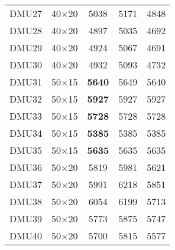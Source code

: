 \begin{table}[H]
\begin{tabular}{@{}ccccc@{}}
DMU27 & 40$\times$20 & 5038 & 5171 & 4848\\ 
DMU28 & 40$\times$20 & 4897 & 5035 & 4692\\ 
DMU29 & 40$\times$20 & 4924 & 5067 & 4691\\ 
DMU30 & 40$\times$20 & 4932 & 5093 & 4732\\ 
DMU31 & 50$\times$15 & \textbf{5640} & 5649 & 5640\\ 
DMU32 & 50$\times$15 & \textbf{5927} & 5927 & 5927\\ 
DMU33 & 50$\times$15 & \textbf{5728} & 5728 & 5728\\ 
DMU34 & 50$\times$15 & \textbf{5385} & 5385 & 5385\\ 
DMU35 & 50$\times$15 & \textbf{5635} & 5635 & 5635\\ 
DMU36 & 50$\times$20 & 5819 & 5981 & 5621\\ 
DMU37 & 50$\times$20 & 5991 & 6218 & 5851\\ 
DMU38 & 50$\times$20 & 6054 & 6199 & 5713\\ 
DMU39 & 50$\times$20 & 5773 & 5875 & 5747\\ 
DMU40 & 50$\times$20 & 5700 & 5815 & 5577\\ \bottomrule
\end{tabular}
\end{table}

